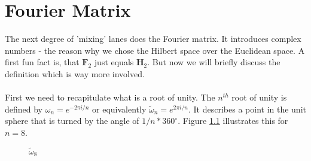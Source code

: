 \documentclass[oneside]{thesisclass}
\begin{document}
\chapter{Fourier Matrix}
The next degree of 'mixing' lanes does the Fourier matrix.
It introduces complex numbers - the reason why we chose the Hilbert space over the Euclidean space.
A first fun fact is, that $\mathbf F_2$ just equals $\mathbf H_2$. 
But now we will briefly discuss the definition which is way more involved.\\
\\First we need to recapitulate what is a root of unity.
The $n^{th}$ root of unity is defined by $\omega _n = e^{-2\pi i/n}$ or equivalently $\tilde{\omega} _n = e^{2\pi i/n}$.
It describes a point in the unit sphere that is turned by the angle of $1/n * 360^\circ$.
Figure \ref{root} illustrates this for $n = 8$.
\begin{figure}
 \begin{center}
\caption{$\tilde{\omega} _8$}
\label{root}
 \end{center}
\end{figure}
\end{document}
